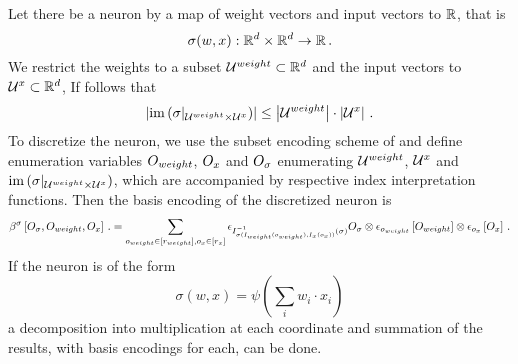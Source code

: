 \begin{example}
	Let there be a neuron by a map of weight vectors and input vectors to $\mathbb{R}$, that is
		\[ \sigma( w, x) : \mathbb{R}^{d} \times \mathbb{R}^{d} \rightarrow \mathbb{R} \, .\]
	We restrict the weights to a subset $\mathcal{U}^{weight}\subset\mathbb{R}^{d}$ and the input vectors to $\mathcal{U}^{x}\subset\mathbb{R}^{d}$,
	If follows that
		\[ \left|\mathrm{im}\left({\sigma}|_{\mathcal{U}^{weight}\times\mathcal{U}^{x}}\right)\right| \leq \left|\mathcal{U}^{weight}\right| \cdot \left|\mathcal{U}^{x}\right| \, . \]
	To discretize the neuron, we use the subset encoding scheme of  and define enumeration variables $O_{weight}$, $O_{x}$ and $O_{\sigma}$ enumerating $\mathcal{U}^{weight}$, $\mathcal{U}^{x}$ and $\mathrm{im}\left({\sigma}|_{\mathcal{U}^{weight}\times\mathcal{U}^{x}}\right)$, which are accompanied by respective index interpretation functions.
	Then the basis encoding of the discretized neuron is
	\begin{align*}
        \beta^{\sigma}\left[O_{\sigma},O_{weight},O_{x}\right] \, .
        = \sum_{o_{weight}\in[r_{weight}],o_{x}\in[r_{x}]}
		\epsilon_{I_{\sigma(I_{weight}(o_{weight}),I_{x}(o_{x}))}^{-1}(\sigma)}{O_{\sigma}}
		\otimes \epsilon_{o_{weight}}\left[O_{weight}\right]
		\otimes \epsilon_{o_{x}}\left[O_{x}\right] \, .
    \end{align*}
	If the neuron is of the form
		\[ \sigma(w,x) = \psi(\sum_i w_i \cdot x_i)\]
	a decomposition into multiplication at each coordinate and summation of the results, with basis encodings for each, can be done.
\end{example}
